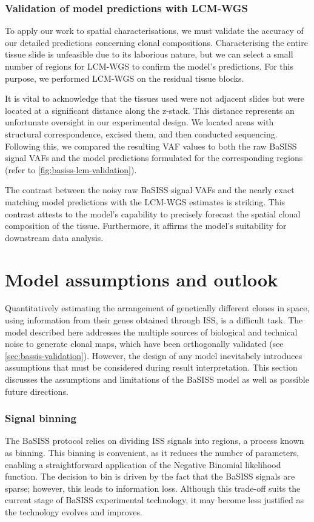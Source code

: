 \subsubsection*{Validation of model predictions with \ac{LCM}-\ac{WGS}}
To apply our work to spatial characterisations, we must validate the accuracy of our detailed predictions concerning clonal compositions. Characterising the entire tissue slide is unfeasible due to its laborious nature, but we can select a small number of regions for \ac{LCM}-\ac{WGS} to confirm the model's predictions. For this purpose, we performed \ac{LCM}-\ac{WGS} on the residual tissue blocks.

It is vital to acknowledge that the tissues used were not adjacent slides but were located at a significant distance along the z-stack. This distance represents an unfortunate oversight in our experimental design. We located areas with structural correspondence, excised them, and then conducted sequencing. Following this, we compared the resulting \ac{VAF} values to both the raw \ac{BaSISS} signal \ac{VAF}s and the model predictions formulated for the corresponding regions (refer to \cref{fig:basiss-lcm-validation}).

The contrast between the noisy raw \ac{BaSISS} signal VAFs and the nearly exact matching model predictions with the \ac{LCM}-\ac{WGS} estimates is striking. This contrast attests to the model's capability to precisely forecast the spatial clonal composition of the tissue. Furthermore, it affirms the model's suitability for downstream data analysis.

\section{Model assumptions and outlook}
\label{sec:basiss-model-assumptions}

Quantitatively estimating the arrangement of genetically different clones in space, using information from their genes obtained through \ac{ISS}, is a difficult task. The model described here addresses the multiple sources of biological and technical noise to generate clonal maps, which have been orthogonally validated (see \cref{sec:bassis-validation}). However, the design of any model inevitabely introduces assumptions that must be considered during result interpretation. This section discusses the assumptions and limitations of the \ac{BaSISS} model as well as possible future directions.

\subsubsection*{Signal binning}
The \ac{BaSISS} protocol relies on dividing \ac{ISS} signals into regions, a process known as binning. This binning is convenient, as it reduces the number of parameters, enabling a straightforward application of the Negative Binomial likelihood function. The decision to bin is driven by the fact that the \ac{BaSISS} signals are sparse; however, this leads to information loss. Although this trade-off suits the current stage of \ac{BaSISS} experimental technology, it may become less justified as the technology evolves and improves.

